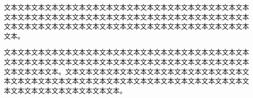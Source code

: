 

\begin{cnabstract}
文本文本文本文本文本文本文本文本文本文本文本文本文本文本文本文本文本文本文本文本文本文本文本文本文本文本文本文本文本文本文本文本文本文本文本文本文本文本文本文本文本文本文本文本文本文本文本文本文本文本文本文本文本文本文本。

文本文本文本文本文本文本文本文本文本文本文本文本文本文本文本文本文本文本文本文本文本文本文本文本文本文本文本文本文本文本文本文本文本文本文本文本文本文本文本文本。文本文本文本文本文本文本文本文本文本文本文本文本文本文本文本文本文本文本文本文本文本文本文本文本文本文本文本文本文本文本文本文本文本文本文本文本文本文本文本文本。

\end{cnabstract}
